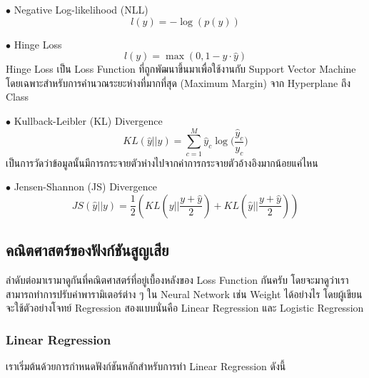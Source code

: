 \noindent $\bullet$ Negative Log-likelihood (NLL)
%
\begin{equation}\label{eq:neg_log_like}
    l(y) = -{\log(p(y))}
\end{equation}

\noindent $\bullet$ Hinge Loss
%
\begin{equation}\label{eq:hinge_loss}
    l(y) = \max(0, 1 - y \cdot \hat{y})
\end{equation}
%
\noindent Hinge Loss เป็น Loss Function ที่ถูกพัฒนาขึ้นมาเพื่อใช้งานกับ Support Vector Machine โดยเฉพาะสำหรับการคำนวณระยะห่างที่มากที่สุด (Maximum Margin) จาก Hyperplane ถึง Class

\noindent $\bullet$ Kullback-Leibler (KL) Divergence
%
\begin{equation}\label{eq:kl_diver}
    KL(\hat{y} || y) = \sum_{c=1}^{M}\hat{y}_c \log \bigg( {\frac{\hat{y}_c}{y_c}} \bigg)
\end{equation}
%
\noindent เป็นการวัดว่าข้อมูลนั้นมีการกระจายตัวห่างไปจากค่าการกระจายตัวอ้างอิงมากน้อยแค่ไหน

\noindent $\bullet$ Jensen-Shannon (JS) Divergence
%
\begin{equation}\label{eq:jensen_shannon_diver}
    JS(\hat{y} || y) = \frac{1}{2} \left ( KL \left ( y||\frac{y+\hat{y}}{2} \right ) +
    KL \left ( \hat{y}||\frac{y+\hat{y}}{2} \right ) \right )
\end{equation}

\subsection{คณิตศาสตร์ของฟังก์ชันสูญเสีย}

ลำดับต่อมาเรามาดูกันที่คณิตศาสตร์ที่อยู่เบื้องหลังของ Loss Function กันครับ โดยจะมาดูว่าเราสามารถทำการปรับค่าพารามิเตอร์ต่าง ๆ ใน Neural Network เช่น Weight ได้อย่างไร โดยผู้เขียนจะใช้ตัวอย่างโจทย์ Regression สองแบบนั่นคือ Linear Regression และ Logistic Regression

\subsubsection{Linear Regression}

เราเริ่มต้นด้วยการกำหนดฟังก์ชันหลักสำหรับการทำ Linear Regression ดังนี้



